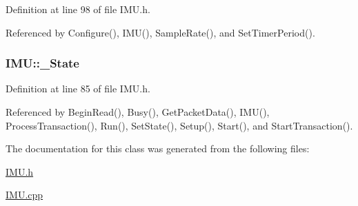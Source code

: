 Definition at line 98 of file IMU.h.



Referenced by Configure(), IMU(), SampleRate(), and SetTimerPeriod().

\hypertarget{class_i_m_u_a2e3c70d02cc2b3dd98ce8153d02cf04e}{
\subsubsection[{\_\-State}]{ {\bf IMU::\_\-State}}}
\label{class_i_m_u_a2e3c70d02cc2b3dd98ce8153d02cf04e}


Definition at line 85 of file IMU.h.



Referenced by BeginRead(), Busy(), GetPacketData(), IMU(), ProcessTransaction(), Run(), SetState(), Setup(), Start(), and StartTransaction().



The documentation for this class was generated from the following files:\begin{DoxyCompactItemize}
\item 
\hyperlink{_i_m_u_8h}{IMU.h}\item 
\hyperlink{_i_m_u_8cpp}{IMU.cpp}\end{DoxyCompactItemize}
